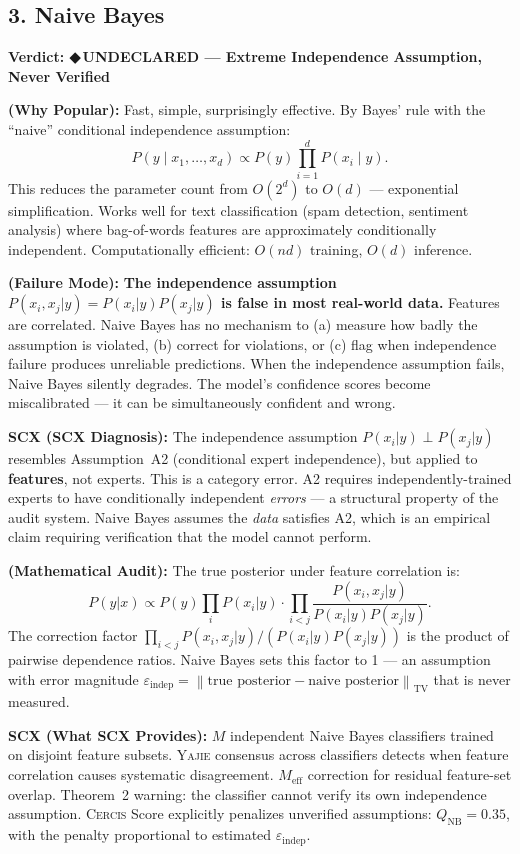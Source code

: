 \documentclass[12pt,a4paper]{article}
\theoremstyle{definition}
\newcommand{\guilty}{{\color{guiltycolor}\textbf{◆\,UNDECLARED}}}
\newcommand{\Yajie}{\textsc{Yajie}}
\newcommand{\Cercis}{\textsc{Cercis}}
\DeclareMathOperator{\TV}{TV}
\newcommand{\norm}[1]{\left\lVert#1\right\rVert}
\newcommand{\auditHeader}[1]{\medskip\noindent\textbf{\large #1}\medskip}
\newcommand{\whyPopular}{\noindent\textbf{ (Why Popular):} }
\newcommand{\whyFail}{\noindent\textbf{ (Failure Mode):} }
\newcommand{\whatMissing}{\noindent\textbf{SCX (What SCX Provides):} }
\newcommand{\diagnosis}{\noindent\textbf{SCX (SCX Diagnosis):} }
\newcommand{\mathAudit}{\noindent\textbf{ (Mathematical Audit):} }
\begin{document}
\subsection{3. Naive Bayes }

\auditHeader{Verdict: \guilty{} — Extreme Independence Assumption, Never Verified}

\whyPopular{} Fast, simple, surprisingly effective. By Bayes' rule with the ``naive'' conditional independence assumption:
\[
P(y \mid x_1, \ldots, x_d) \propto P(y) \prod_{i=1}^d P(x_i \mid y).
\]
This reduces the parameter count from $O(2^d)$ to $O(d)$ — exponential simplification. Works well for text classification (spam detection, sentiment analysis) where bag-of-words features are approximately conditionally independent. Computationally efficient: $O(nd)$ training, $O(d)$ inference.

\whyFail{} \textbf{The independence assumption $P(x_i, x_j|y) = P(x_i|y)P(x_j|y)$ is false in most real-world data.} Features are correlated. Naive Bayes has no mechanism to (a) measure how badly the assumption is violated, (b) correct for violations, or (c) flag when independence failure produces unreliable predictions. When the independence assumption fails, Naive Bayes silently degrades. The model's confidence scores become miscalibrated — it can be simultaneously confident and wrong.

\diagnosis{} The independence assumption $P(x_i|y) \perp P(x_j|y)$ resembles Assumption~A2 (conditional expert independence), but applied to \textbf{features}, not experts. This is a category error. A2 requires independently-trained experts to have conditionally independent \textit{errors} — a structural property of the audit system. Naive Bayes assumes the \textit{data} satisfies A2, which is an empirical claim requiring verification that the model cannot perform.

\mathAudit{} The true posterior under feature correlation is:
\[
P(y|x) \propto P(y) \prod_i P(x_i|y) \cdot \prod_{i<j} \frac{P(x_i, x_j|y)}{P(x_i|y)P(x_j|y)}.
\]
The correction factor $\prod_{i<j} P(x_i, x_j|y) / (P(x_i|y)P(x_j|y))$ is the product of pairwise dependence ratios. Naive Bayes sets this factor to 1 — an assumption with error magnitude $\varepsilon_{\text{indep}} = \norm{\text{true posterior} - \text{naive posterior}}_{\TV}$ that is never measured.

\whatMissing{} $M$ independent Naive Bayes classifiers trained on disjoint feature subsets. \Yajie{} consensus across classifiers detects when feature correlation causes systematic disagreement. $M_{\text{eff}}$ correction for residual feature-set overlap. Theorem~2 warning: the classifier cannot verify its own independence assumption. \Cercis{} Score explicitly penalizes unverified assumptions: $Q_{\text{NB}} = 0.35$, with the penalty proportional to estimated $\varepsilon_{\text{indep}}$.
\end{document}
